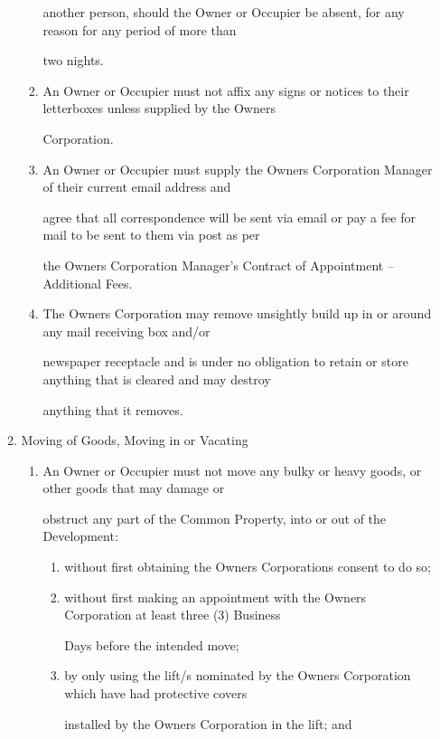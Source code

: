 \documentclass{article}
\begin{document}
\begin{enumerate}[label=\arabic*.]
\begin{enumerate}[label=\arabic{enumi}.\arabic*.]
\begin{enumerate}[label=(\arabic*)]
another person, should the Owner or Occupier be absent, for any reason for any period of more than 

two nights. 

\newpage

\item  An Owner or Occupier must not affix any signs or notices to their letterboxes unless supplied by the Owners 

Corporation. 

\item  An Owner or Occupier must supply the Owners Corporation Manager of their current email address and 

agree that all correspondence will be sent via email or pay a fee for mail to be sent to them via post as per 

the Owners Corporation Manager’s Contract of Appointment – Additional Fees. 

\item  The Owners Corporation may remove unsightly build up in or around any mail receiving box and/or 

newspaper receptacle and is under no obligation to retain or store anything that is cleared and may destroy 

anything that it removes. 

\end{enumerate}
\item  Moving of Goods, Moving in or Vacating 

\begin{enumerate}[label=(\arabic*)]
\item  An Owner or Occupier must not move any bulky or heavy goods, or other goods that may damage or 

obstruct any part of the Common Property, into or out of the Development: 

\begin{enumerate}[label=(\alph*)]
\item  without first obtaining the Owners Corporations consent to do so; 

\item  without first making an appointment with the Owners Corporation at least three (3) Business 

Days before the intended move; 

\item  by only using the lift/s nominated by the Owners Corporation which have had protective covers 

installed by the Owners Corporation in the lift; and 


\end{enumerate}
\end{enumerate}
\end{enumerate}
\end{enumerate}
\end{document}
